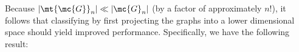\documentclass[10pt,journal,cspaper,compsoc]{IEEEtran}
\begin{document}
Because $|\mt{\mc{G}}_n| \ll |\mc{G}_n|$ (by a factor of approximately $n!$), it follows that classifying by first projecting the graphs into a lower dimensional space should yield improved performance.  Specifically, we have the following result:
\end{document}
